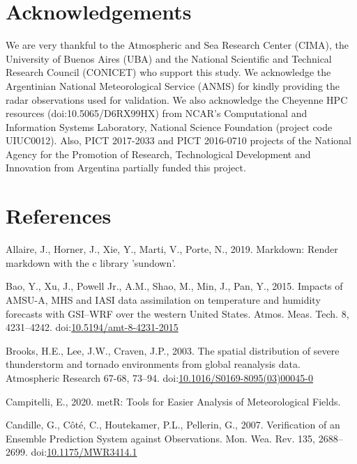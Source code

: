 \documentclass[final,5p,times,twocolumn,authoryear]{elsarticle} %
\begin{document}
\hypertarget{acknowledgements}{%
\section{Acknowledgements}\label{acknowledgements}}

We are very thankful to the Atmospheric and Sea Research Center (CIMA), the University of Buenos Aires (UBA) and the National Scientific and Technical Research Council (CONICET) who support this study. We acknowledge the Argentinian National Meteorological Service (ANMS) for kindly providing the radar observations used for validation. We also acknowledge the Cheyenne HPC resources (doi:10.5065/D6RX99HX) from NCAR's Computational and Information Systems Laboratory, National Science Foundation (project code UIUC0012). Also, PICT 2017-2033 and PICT 2016-0710 projects of the National Agency for the Promotion of Research, Technological Development and Innovation from Argentina partially funded this project.

\hypertarget{references}{%
\section*{References}\label{references}}

\hypertarget{refs}{}
\leavevmode\hypertarget{ref-allaire2019}{}%
Allaire, J., Horner, J., Xie, Y., Marti, V., Porte, N., 2019. Markdown: Render markdown with the c library 'sundown'.

\leavevmode\hypertarget{ref-bao2015}{}%
Bao, Y., Xu, J., Powell Jr., A.M., Shao, M., Min, J., Pan, Y., 2015. Impacts of AMSU-A, MHS and IASI data assimilation on temperature and humidity forecasts with GSI--WRF over the western United States. Atmos. Meas. Tech. 8, 4231--4242. doi:\href{https://doi.org/10.5194/amt-8-4231-2015}{10.5194/amt-8-4231-2015}

\leavevmode\hypertarget{ref-brooks2003}{}%
Brooks, H.E., Lee, J.W., Craven, J.P., 2003. The spatial distribution of severe thunderstorm and tornado environments from global reanalysis data. Atmospheric Research 67-68, 73--94. doi:\href{https://doi.org/10.1016/S0169-8095(03)00045-0}{10.1016/S0169-8095(03)00045-0}

\leavevmode\hypertarget{ref-campitelli2020}{}%
Campitelli, E., 2020. metR: Tools for Easier Analysis of Meteorological Fields.

\leavevmode\hypertarget{ref-candille2007}{}%
Candille, G., Côté, C., Houtekamer, P.L., Pellerin, G., 2007. Verification of an Ensemble Prediction System against Observations. Mon. Wea. Rev. 135, 2688--2699. doi:\href{https://doi.org/10.1175/MWR3414.1}{10.1175/MWR3414.1}
\end{document}

